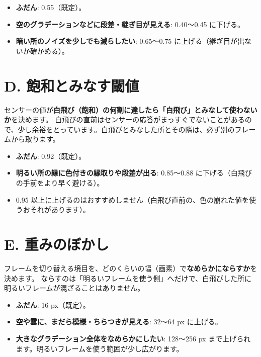 \documentclass[paper=a4paper,fontsize=11pt,report,jafontsize=11pt]{jlreq}
\begin{document}
\begin{tip}[変えるときの目安]
\begin{itemize}
  \item \textbf{ふだん}: 0.55（既定）。
  \item \textbf{空のグラデーションなどに段差・継ぎ目が見える}: 0.40〜0.45 に下げる。
  \item \textbf{暗い所のノイズを少しでも減らしたい}: 0.65〜0.75 に上げる（継ぎ目が出ないか確かめる）。
\end{itemize}
\end{tip}

\section{D. 飽和とみなす閾値}
センサーの値が\textbf{白飛び（飽和）の何割に達したら「白飛び」とみなして使わないか}を決めます。
白飛びの直前はセンサーの応答がまっすぐでないことがあるので、少し余裕をとっています。白飛びとみなした所とその隣は、必ず別のフレームから取ります。

\begin{tip}[変えるときの目安]
\begin{itemize}
  \item \textbf{ふだん}: 0.92（既定）。
  \item \textbf{明るい所の縁に色付きの縁取りや段差が出る}: 0.85〜0.88 に下げる（白飛びの手前をより早く避ける）。
  \item 0.95 以上に上げるのはおすすめしません（白飛び直前の、色の崩れた値を使うおそれがあります）。
\end{itemize}
\end{tip}

\section{E. 重みのぼかし}
フレームを切り替える境目を、どのくらいの幅（画素）で\textbf{なめらかにならすか}を決めます。
ならすのは「明るいフレームを使う側」へだけで、白飛びした所に明るいフレームが混ざることはありません。

\begin{tip}[変えるときの目安]
\begin{itemize}
  \item \textbf{ふだん}: 16 px（既定）。
  \item \textbf{空や雲に、まだら模様・ちらつきが見える}: 32〜64 px に上げる。
  \item \textbf{大きなグラデーション全体をなめらかにしたい}: 128〜256 px まで上げられます。明るいフレームを使う範囲が少し広がります。
\end{itemize}
\end{tip}
\end{document}

